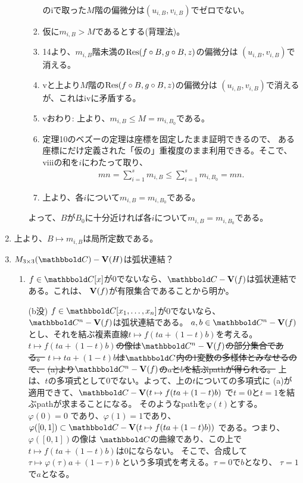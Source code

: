 \begin{myproof}
\begin{enumerate}
\begin{enumerate}
\begin{enumerate}
        のiで取った$M$階の偏微分は$(u_{i,B},v_{i,B})$でゼロでない。
        \item
        仮に$m_{i,B} > M$であるとする(背理法)。
        \item
        14より、$m_{i,B}$階未満の$\mathrm{Res}(f\circ B, g\circ B, z)$の偏微分は
        $(u_{i,B},v_{i,B})$で消える。
        \item
        vと上より$M$階の$\mathrm{Res}(f\circ B, g\circ B, z)$の偏微分は
        $(u_{i,B},v_{i,B})$で消えるが、これはivに矛盾する。
        \item
        vおわり: 上より、$m_{i,B}\le M = m_{i,B_0}$である。
        \item
        定理10のベズーの定理は座標を固定したまま証明できるので、
        ある座標にだけ定義された「仮の」重複度のまま利用できる。そこで、
        viiiの和を$i$にわたって取り、
        \begin{align}
          mn = \sum_{i=1}^s m_{i,B} \le \sum_{i=1}^s m_{i,B_0} = mn.
        \end{align}
        \item
        上より、各$i$について$m_{i,B} = m_{i,B_0}$である。
      \end{enumerate}
      よって、$B$が$B_0$に十分近ければ各$i$について$m_{i,B} = m_{i,B_0}$である。
    \end{enumerate}
    \item
    上より、$B\mapsto m_{i,B}$は局所定数である。
    \item
    $M_{3\times 3}(\C)-\var(H)$は弧状連結？
    \begin{enumerate}
      \item $f\in \C[x]$が0でないなら、$\C-\var(f)$は弧状連結である。これは、
      $\textbf V(f)$が有限集合であることから明か。
      \item[(b没)] $f\in \C[x_1,\dots,x_n]$が0でないなら、
      $\C^n - \var(f)$は弧状連結である。
      $a,b\in \C^n-\var(f)$とし、それを結ぶ複素直線$t\mapsto f(ta + (1-t)b)$を考える。
      \sout{$t\mapsto f(ta+(1-t)b)$の像は$\C^n - \var(f)$の部分集合である。}
      \sout{$t\mapsto ta+(1-t)b$は$\C$内の1変数の多様体とみなせるので、}
      \sout{(a)より$\C^n - \var(f)$の$a$と$b$を結ぶpathが得られる。}
      上は、$t$の多項式として0でない。よって、上の$t$についての多項式に
      (a)が適用できて、$\C-\var(t\mapsto f(ta+(1-t)b)$
      で$t=0$と$t=1$を結ぶpathが求まることになる。
      そのようなpathを$\varphi(t)$とする。$\varphi(0) = 0$
      であり、$\varphi(1)=1$であり、$\varphi([0,1]) \subset \C-\var(t\mapsto f(ta+(1-t)b))$
      である。つまり、$\varphi([0,1])$の像は
      $\C$の曲線であり、この上で$t\mapsto f(ta+(1-t)b)$は0にならない。
      そこで、合成して$\tau \mapsto \varphi(\tau)a + (1-\tau)b$
      という多項式を考える。$\tau = 0$で$b$となり、
      $\tau = 1$で$a$となる。


\end{enumerate}
\end{enumerate}
\end{myproof}
